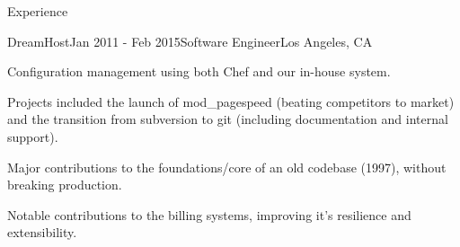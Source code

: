 \documentclass{resume} %
\begin{document}
\begin{rSection}{Experience}
\begin{rSubsection}{DreamHost}{Jan 2011 - Feb 2015}{Software Engineer}{Los Angeles, CA}
\item Configuration management using both Chef and our in-house system.
\item Projects included the launch of mod\_pagespeed (beating competitors to market) and the transition from subversion to git (including documentation and internal support).
\item Major contributions to the foundations/core of an old codebase (1997), without breaking production.
\item Notable contributions to the billing systems, improving it's resilience and extensibility.

\end{rSubsection}
\end{rSection}
\end{document}
